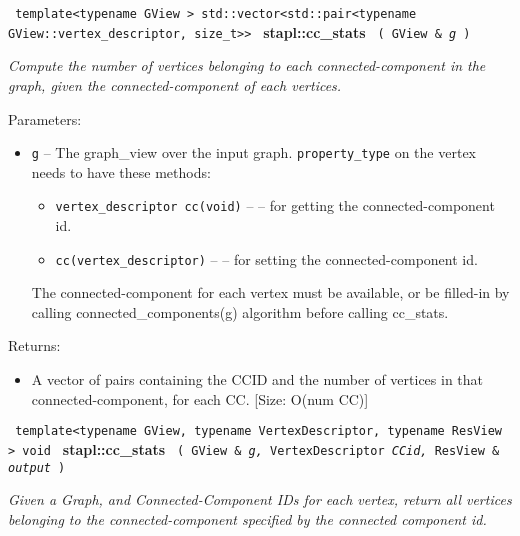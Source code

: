\noindent
\texttt{%
template<typename GView >
\newline
std::vector<std::pair<typename GView::vertex\_descriptor, size\_t>> 
}
\newline
\textbf{stapl::cc\_stats}%
\newline
\texttt{%
(
GView \&
\textit{g}%
)    
}
\vspace{0.4cm}

\textit{
Compute the number of vertices belonging to each connected-component in the graph, given the connected-component of each vertices.
}
\vspace{0.4cm}

Parameters:
\begin{itemize}
\item
\texttt{g} --
The graph\_view over the input graph. 
\texttt{property\_type}%
on the vertex needs to have these methods: 
\begin{itemize}
\item
\texttt{vertex\_descriptor cc(void)} --
– for getting the connected-component id. 
\item
\texttt{cc(vertex\_descriptor)} --
– for setting the connected-component id. 
\end{itemize}
The connected-component for each vertex must be available, or be filled-in by calling connected\_components(g) algorithm before calling cc\_stats.
\end{itemize}

Returns:
\begin{itemize}
\item
A vector of pairs containing the CCID and the number of vertices in that connected-component, for each CC. [Size: O(num CC)] 
\end{itemize}


\noindent
\texttt{%
template<typename GView, typename VertexDescriptor, typename ResView >
\newline
void 
}
\textbf{stapl::cc\_stats}%
\newline
\texttt{%
(
GView \&
\textit{g,}%
VertexDescriptor
\textit{CCid,}%
ResView \&
\textit{output}%
)     
}
\vspace{0.4cm}

\textit{
Given a Graph, and Connected-Component IDs for each vertex, return all vertices belonging to the connected-component specified by the connected component id.
}
\vspace{0.4cm}

